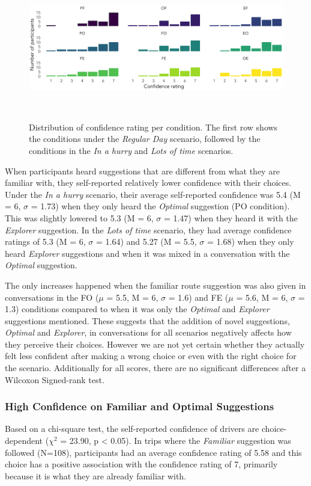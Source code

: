 \begin{figure}
\centering
  \includegraphics[scale=0.4]{figures/s2-confidence_per_condition.png}
  \caption{Distribution of confidence rating per condition. The first row shows the conditions under the \textit{Regular Day} scenario, followed by the conditions in the \textit{In a hurry} and \textit{Lots of time} scenarios.}~\label{fig:cond-conf}
\end{figure}

When participants heard suggestions that are different from what they are familiar with, they self-reported relatively lower confidence with their choices. Under the \textit{In a hurry} scenario, their average self-reported confidence was 5.4 (M = 6, $\sigma$ = 1.73) when they only heard the \textit{Optimal} suggestion (PO condition). This was slightly lowered to 5.3 (M = 6, $\sigma$ = 1.47) when they heard it with the \textit{Explorer} suggestion. In the \textit{Lots of time} scenario, they had average confidence ratings of 5.3 (M = 6, $\sigma$ = 1.64) and 5.27 (M = 5.5, $\sigma$ = 1.68) when they only heard \textit{Explorer} suggestions and when it was mixed in a conversation with the \textit{Optimal} suggestion. 

The only increases happened when the familiar route suggestion was also given in conversations in the FO ($\mu$ =  5.5, M = 6, $\sigma$ = 1.6) and FE ($\mu$ =  5.6, M = 6, $\sigma$ = 1.3) conditions compared to when it was only the \textit{Optimal} and \textit{Explorer} suggestions mentioned. These suggests that the addition of novel suggestions, \textit{Optimal} and \textit{Explorer}, in conversations for all scenarios negatively affects how they perceive their choices. However we are not yet certain whether they actually felt less confident after making a wrong choice or even with the right choice for the scenario. Additionally for all scores, there are no significant differences after a Wilcoxon Signed-rank test.  

\subsubsection{High Confidence on Familiar and Optimal Suggestions}
Based on a chi-square test, the self-reported confidence of drivers are choice-dependent ($\chi^2$ = 23.90, p < 0.05). In trips where the \textit{Familiar} suggestion was followed (N=108), participants had an average confidence rating of 5.58 and this choice has a positive association with the confidence rating of 7, primarily because it is what they are already familiar with.

